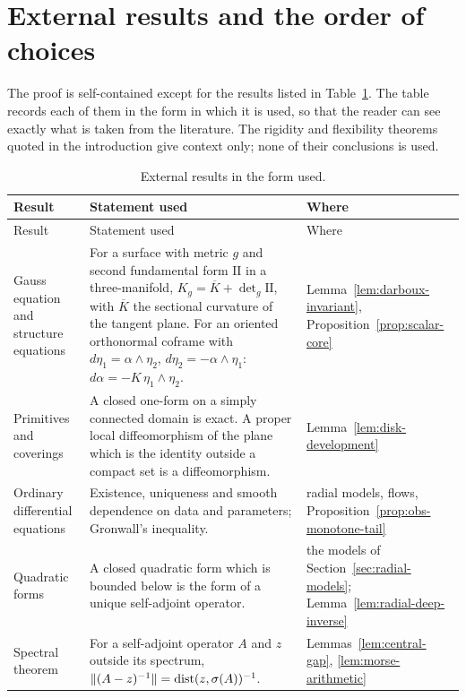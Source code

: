 \section{External results and the order of choices}
\label{app:dependencies}

The proof is self-contained except for the results listed in
Table~\ref{tab:external}. The table records each of them in the form
in which it is used, so that the reader can see exactly what is taken
from the literature. The rigidity and flexibility theorems quoted in
the introduction give context only; none of their conclusions is used.

\renewcommand{\arraystretch}{1.12}\setlength{\tabcolsep}{4pt}
\begin{longtable}{@{}p{.21\linewidth}p{.47\linewidth}p{.25\linewidth}@{}}
\caption{External results in the form used.}\label{tab:external}\\
\toprule
Result & Statement used & Where\\
\midrule
\endfirsthead
\toprule
Result & Statement used & Where\\
\midrule
\endhead
Gauss equation and structure equations &
 For a surface with metric $g$ and second fundamental form
 $\mathrm{II}$ in a three-manifold, $K_g=\overline K+\det_g\mathrm{II}$,
 with $\overline K$ the sectional curvature of the tangent plane. For
 an oriented orthonormal coframe with
 $d\eta_1=\alpha\wedge\eta_2$, $d\eta_2=-\alpha\wedge\eta_1$:
 $d\alpha=-K\,\eta_1\wedge\eta_2$. &
 Lemma~\ref{lem:darboux-invariant},
 Proposition~\ref{prop:scalar-core}\\
Primitives and coverings &
 A closed one-form on a simply connected domain is exact. A proper
 local diffeomorphism of the plane which is the identity outside a
 compact set is a diffeomorphism. &
 Lemma~\ref{lem:disk-development}\\
Ordinary differential equations &
 Existence, uniqueness and smooth dependence on data and parameters;
 Gronwall's inequality. &
 radial models, flows, Proposition~\ref{prop:obs-monotone-tail}\\
Quadratic forms \cite[Theorems~2.12, 2.13]{Teschl2009} &
 A closed quadratic form which is bounded below is the form of a
 unique self-adjoint operator. &
 the models of Section~\ref{sec:radial-models};
 Lemma~\ref{lem:radial-deep-inverse}\\
Spectral theorem \cite[Chapter~3]{Teschl2009} &
 For a self-adjoint operator $A$ and $z$ outside its spectrum,
 $\|(A-z)^{-1}\|=\operatorname{dist}(z,\sigma(A))^{-1}$. &
 Lemmas~\ref{lem:central-gap}, \ref{lem:morse-arithmetic}\\

\end{longtable}
